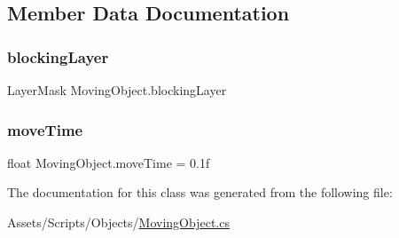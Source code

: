 \subsection{Member Data Documentation}
\mbox{\label{class_moving_object_add4cf20e336559d38cc6a57763775e36}} 
\subsubsection{\texorpdfstring{blocking\+Layer}{blockingLayer}}
{\footnotesize\ttfamily Layer\+Mask Moving\+Object.\+blocking\+Layer}

\mbox{\label{class_moving_object_a2596eb0312a148176541ac08fb18b173}} 
\subsubsection{\texorpdfstring{move\+Time}{moveTime}}
{\footnotesize\ttfamily float Moving\+Object.\+move\+Time = 0.\+1f}



The documentation for this class was generated from the following file\+:\begin{DoxyCompactItemize}
\item 
Assets/\+Scripts/\+Objects/\mbox{\hyperlink{_moving_object_8cs}{Moving\+Object.\+cs}}\end{DoxyCompactItemize}
